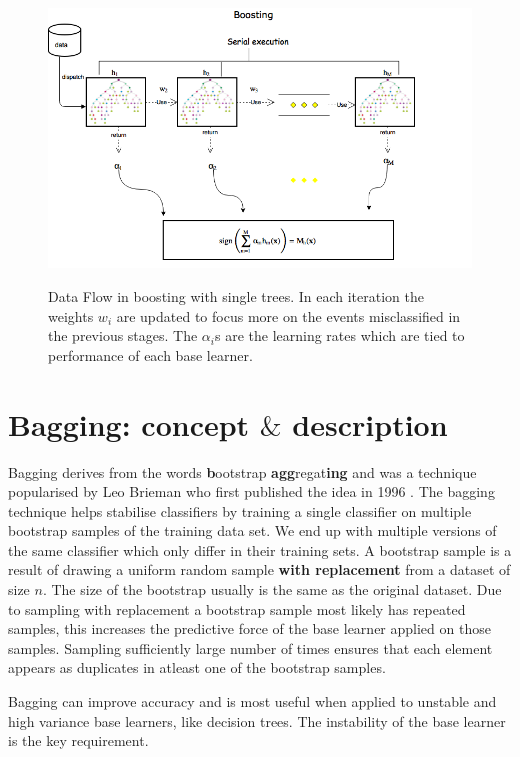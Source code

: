\begin{figure}[ht]
\includegraphics[width=\textwidth]{images/boostingflow.png}
\label{boosting}
\caption{Data Flow in boosting with single trees. In each iteration the weights $w_{i}$ are updated to focus more on the events misclassified in the previous stages. The $\alpha_{i}$s are the learning rates which are tied to performance of each base learner.}
\end{figure}

\section{Bagging: concept \texorpdfstring{$\&$}{} description}

Bagging derives from the words \textbf{b}ootstrap \textbf{agg}regat\textbf{ing} and was a technique popularised by Leo Brieman who first published the idea in 1996 \cite{bagging}. The bagging technique helps stabilise classifiers by training a single classifier on multiple bootstrap samples of the training data set. We end up with multiple versions of the same classifier which only differ in their training sets. A bootstrap sample is a result of drawing a uniform random sample \textbf{with replacement} from a dataset of size $n$. The size of the bootstrap usually is the same as the original dataset. Due to sampling with replacement a bootstrap sample most likely has repeated samples, this increases the predictive force of the base learner applied on those samples. Sampling sufficiently large number of times ensures that each element appears as duplicates in atleast one of the bootstrap samples.

Bagging can improve accuracy and is most useful when applied to unstable and high variance base learners, like decision trees. The instability of the base learner is the key requirement. 

